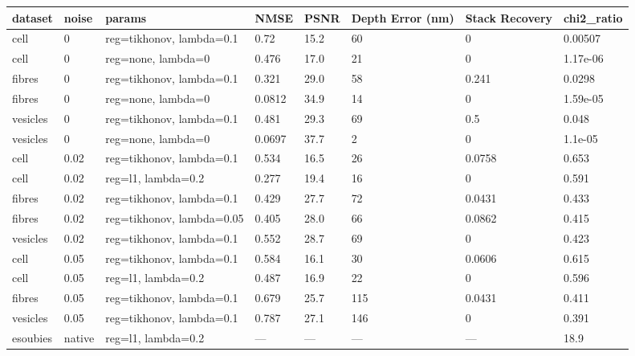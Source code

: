 \begin{center}\begin{minipage}{\linewidth}\centering
{}
\begin{adjustbox}{max width=\linewidth}
\begin{tabular}{llllllll}
\toprule
dataset & noise & params & NMSE & PSNR & Depth Error (nm) & Stack Recovery & chi2\_ratio \\
\midrule
cell & 0 & reg=tikhonov, lambda=0.1 & 0.72 & 15.2 & 60 & 0 & 0.00507 \\
cell & 0 & reg=none, lambda=0 & 0.476 & 17.0 & 21 & 0 & 1.17e-06 \\
fibres & 0 & reg=tikhonov, lambda=0.1 & 0.321 & 29.0 & 58 & 0.241 & 0.0298 \\
fibres & 0 & reg=none, lambda=0 & 0.0812 & 34.9 & 14 & 0 & 1.59e-05 \\
vesicles & 0 & reg=tikhonov, lambda=0.1 & 0.481 & 29.3 & 69 & 0.5 & 0.048 \\
vesicles & 0 & reg=none, lambda=0 & 0.0697 & 37.7 & 2 & 0 & 1.1e-05 \\
cell & 0.02 & reg=tikhonov, lambda=0.1 & 0.534 & 16.5 & 26 & 0.0758 & 0.653 \\
cell & 0.02 & reg=l1, lambda=0.2 & 0.277 & 19.4 & 16 & 0 & 0.591 \\
fibres & 0.02 & reg=tikhonov, lambda=0.1 & 0.429 & 27.7 & 72 & 0.0431 & 0.433 \\
fibres & 0.02 & reg=tikhonov, lambda=0.05 & 0.405 & 28.0 & 66 & 0.0862 & 0.415 \\
vesicles & 0.02 & reg=tikhonov, lambda=0.1 & 0.552 & 28.7 & 69 & 0 & 0.423 \\
cell & 0.05 & reg=tikhonov, lambda=0.1 & 0.584 & 16.1 & 30 & 0.0606 & 0.615 \\
cell & 0.05 & reg=l1, lambda=0.2 & 0.487 & 16.9 & 22 & 0 & 0.596 \\
fibres & 0.05 & reg=tikhonov, lambda=0.1 & 0.679 & 25.7 & 115 & 0.0431 & 0.411 \\
vesicles & 0.05 & reg=tikhonov, lambda=0.1 & 0.787 & 27.1 & 146 & 0 & 0.391 \\
esoubies & native & reg=l1, lambda=0.2 & — & — & — & — & 18.9 \\
\bottomrule
\end{tabular}\end{adjustbox}\end{minipage}\end{center}
